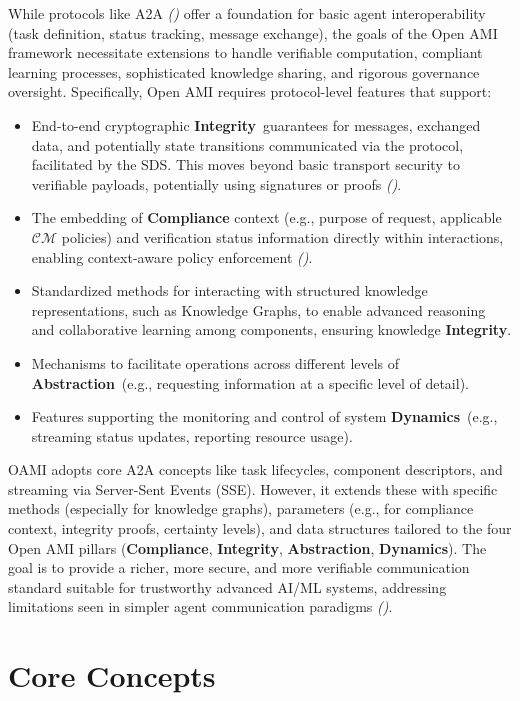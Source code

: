 \documentclass[12pt,a4paper]{report}
\renewcommand{\citep}[1]{\textit{\scriptsize{(\cite{#1})}}}
\newcommand{\Compliance}{\textbf{Compliance}}
\newcommand{\Integrity}{\textbf{Integrity}}
\newcommand{\Abstraction}{\textbf{Abstraction}}
\newcommand{\Dynamics}{\textbf{Dynamics}}
\begin{document}
	While protocols like A2A \citep{A2A_README} offer a foundation for basic agent interoperability (task definition, status tracking, message exchange), the goals of the Open AMI framework necessitate extensions to handle verifiable computation, compliant learning processes, sophisticated knowledge sharing, and rigorous governance oversight. Specifically, Open AMI requires protocol-level features that support:
	\begin{itemize}
		\item End-to-end cryptographic \Integrity\ guarantees for messages, exchanged data, and potentially state transitions communicated via the protocol, facilitated by the SDS. This moves beyond basic transport security to verifiable payloads, potentially using signatures or proofs \citep{Peng2025ZKMLSurvey}.
		\item The embedding of \textbf{Compliance} context (e.g., purpose of request, applicable $\mathcal{CM}$ policies) and verification status information directly within interactions, enabling context-aware policy enforcement \citep{Sekrst2024Guardrails}.
		\item Standardized methods for interacting with structured knowledge representations, such as Knowledge Graphs, to enable advanced reasoning and collaborative learning among components, ensuring knowledge \Integrity.
		\item Mechanisms to facilitate operations across different levels of \Abstraction\ (e.g., requesting information at a specific level of detail).
		\item Features supporting the monitoring and control of system \Dynamics\ (e.g., streaming status updates, reporting resource usage).
	\end{itemize}
	OAMI adopts core A2A concepts like task lifecycles, component descriptors, and streaming via Server-Sent Events (SSE). However, it extends these with specific methods (especially for knowledge graphs), parameters (e.g., for compliance context, integrity proofs, certainty levels), and data structures tailored to the four Open AMI pillars (\Compliance, \Integrity, \Abstraction, \Dynamics). The goal is to provide a richer, more secure, and more verifiable communication standard suitable for trustworthy advanced AI/ML systems, addressing limitations seen in simpler agent communication paradigms \citep{AdditionalCitationRef52}.
	
	\section{Core Concepts}
	\label{app:oami_concepts}
	
\end{document}
